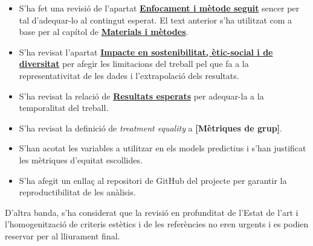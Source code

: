 \documentclass[CAT]{TFUOC}%
\begin{document}
\begin{itemize}
\item
  S'ha fet una revisió de l'apartat \textbf{\hyperref[enfocament-i-muxe8tode-seguit]{Enfocament i mètode seguit}} sencer per tal d'adequar-lo al contingut esperat. El text anterior s'ha utilitzat com a base per al capítol de \textbf{\hyperref[materials-i-muxe8todes]{Materials i mètodes}}.
\item
  S'ha revisat l'apartat \textbf{\hyperref[impacte-en-sostenibilitat-uxe8tic-social-i-de-diversitat]{Impacte en sostenibilitat, ètic-social i de diversitat}} per afegir les limitacions del treball pel que fa a la representativitat de les dades i l'extrapolació dels resultats.
\item
  S'ha revisat la relació de \textbf{\hyperref[resultats-esperats]{Resultats esperats}} per adequar-la a la temporalitat del treball.
\item
  S'ha revisat la definició de \emph{treatment equality} a \textbf{{[}Mètriques de grup{]}}.
\item
  S'han acotat les variables a utilitzar en els models predictius i s'han justificat les mètriques d'equitat escollides.
\item
  S'ha afegit un enllaç al repositori de GitHub del projecte per garantir la reproductibilitat de les anàlisis.
\end{itemize}

D'altra banda, s'ha considerat que la revisió en profunditat de l'Estat de l'art i l'homogenització de criteris estètics i de les referències no eren urgents i es podien reservar per al lliurament final.
\end{document}
